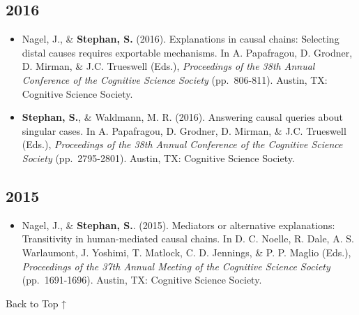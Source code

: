 \documentclass[
]{article}
\providecommand{\tightlist}{%
  \setlength{\itemsep}{0pt}\setlength{\parskip}{0pt}}
\begin{document}
\hypertarget{section-11}{%
\subsection{2016}\label{section-11}}

\begin{itemize}
\item
  Nagel, J., \& \textbf{Stephan, S.} (2016). Explanations in causal
  chains: Selecting distal causes requires exportable mechanisms. In A.
  Papafragou, D. Grodner, D. Mirman, \& J.C. Trueswell (Eds.),
  \emph{Proceedings of the 38th Annual Conference of the Cognitive
  Science Society} (pp.~806-811). Austin, TX: Cognitive Science Society.
  {\href{publications/Nagel-Stephan-2016-_Explanations\%20in\%20causal\%20chains_selecting\%20distal\%20causes.pdf}{}}
  {\href{https://www.psych.uni-goettingen.de/de/cognition/publikationen-dateien-stephan/2016_Poster_CogSci_Stephan.pdf}{}}
\item
  \textbf{Stephan, S.}, \& Waldmann, M. R. (2016). Answering causal
  queries about singular cases. In A. Papafragou, D. Grodner, D. Mirman,
  \& J.C. Trueswell (Eds.), \emph{Proceedings of the 38th Annual
  Conference of the Cognitive Science Society} (pp.~2795-2801). Austin,
  TX: Cognitive Science Society.
  {\href{publications/Stephan-Waldmann-2016_Answering\%20causal\%20queries\%20about\%20singular\%20cases.pdf}{}}
\end{itemize}

\hypertarget{section-12}{%
\subsection{2015}\label{section-12}}

\begin{itemize}
\tightlist
\item
  Nagel, J., \& \textbf{Stephan, S.}. (2015). Mediators or alternative
  explanations: Transitivity in human-mediated causal chains. In D. C.
  Noelle, R. Dale, A. S. Warlaumont, J. Yoshimi, T. Matlock, C. D.
  Jennings, \& P. P. Maglio (Eds.), \emph{Proceedings of the 37th Annual
  Meeting of the Cognitive Science Society} (pp.~1691-1696). Austin, TX:
  Cognitive Science Society.
  {\href{publications/Nagel-Stephan-2015_mediators.pdf}{}}
  {\href{https://www.psych.uni-goettingen.de/de/cognition/publikationen-dateien-stephan/2015_Poster_CogSci_Stephan.pdf}{}}
\end{itemize}

Back to Top ↑
\end{document}
